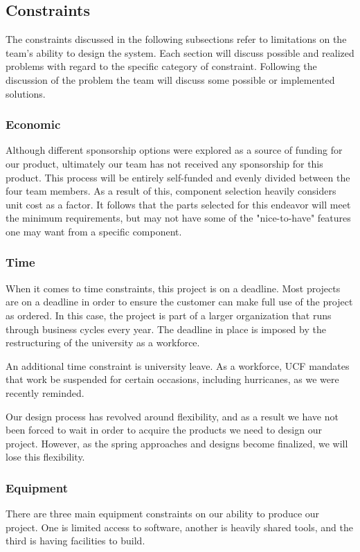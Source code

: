 \subsection{Constraints}
The constraints discussed in the following subsections refer to limitations on the team's ability to design the system. Each section will discuss possible and realized problems with regard to the specific category of constraint. Following the discussion of the problem the team will discuss some possible or implemented solutions.
\subsubsection{Economic}
Although different sponsorship options were explored as a source of funding for our product, ultimately our team has not received any sponsorship for this product. This process will be entirely self-funded and evenly divided between the four team members. As a result of this, component selection heavily considers unit cost as a factor. It follows that the parts selected for this endeavor will meet the minimum requirements, but may not have some of the "nice-to-have" features one may want from a specific component. 
\subsubsection{Time}
When it comes to time constraints, this project is on a deadline. Most projects are on a deadline in order to ensure the customer can make full use of the project as ordered. In this case, the project is part of a larger organization that runs through business cycles every year. The deadline in place is imposed by the restructuring of the university as a workforce.

An additional time constraint is university leave. As a workforce, UCF mandates that work be suspended for certain occasions, including hurricanes, as we were recently reminded.

Our design process has revolved around flexibility, and as a result we have not been forced to wait in order to acquire the products we need to design our project. However, as the spring approaches and designs become finalized, we will lose this flexibility. 

\subsubsection{Equipment}
There are three main equipment constraints on our ability to produce our project. One is limited access to software, another is heavily shared tools, and the third is having facilities to build.

